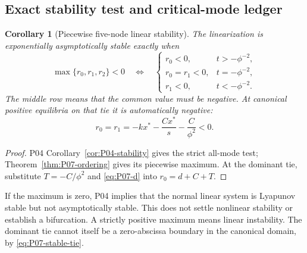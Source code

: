 \documentclass[11pt]{article}
\newtheorem{corollary}[theorem]{Corollary}
\theoremstyle{definition}
\theoremstyle{remark}
\begin{document}
\subsection{Exact stability test and critical-mode ledger}
\begin{corollary}[Piecewise five-node linear stability]
\label{cor:P07-stability}
The linearization is exponentially asymptotically stable exactly when
\begin{equation}
 \max\{r_0,r_1,r_2\}<0
 \quad\Longleftrightarrow\quad
 \begin{cases}
 r_0<0,&t>-\phi^{-2},\\
 r_0=r_1<0,&t=-\phi^{-2},\\
 r_1<0,&t<-\phi^{-2}.
 \end{cases}
 \label{eq:P07-stability}
\end{equation}
The middle row means that the common value must be negative. At canonical
positive equilibria on that tie it is automatically negative:
\begin{equation}
 r_0=r_1=-kx^*-\frac{Cx^*}{s}-\frac{C}{\phi^2}<0.
 \label{eq:P07-stable-tie}
\end{equation}
\end{corollary}
\begin{proof}
P04 Corollary~\ref{cor:P04-stability} gives the strict all-mode test;
Theorem~\ref{thm:P07-ordering} gives its piecewise maximum.
At the dominant tie, substitute $T=-C/\phi^2$ and
\eqref{eq:P07-d} into $r_0=d+C+T$.
\end{proof}
If the maximum is zero, P04 implies that the normal linear system is
Lyapunov stable but not asymptotically stable. This does not settle
nonlinear stability or establish a bifurcation. A strictly positive
maximum means linear instability. The dominant tie cannot itself be a
zero-abscissa boundary in the canonical domain, by
\eqref{eq:P07-stable-tie}.
\end{document}
